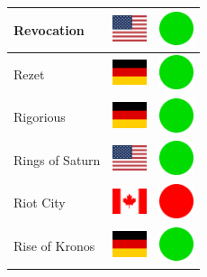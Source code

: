 \documentclass[12pt, a4paper, twoside]{report}
\begin{document}
\begin{center}
\begin{longtable}{|p{5cm}|p{2cm}|p{2cm}|}
 Revocation                                                 & \includegraphics[width=1cm]{../img/flags/us} &   \includegraphics[width=1cm]{../likes/y} \\ \hline
 Rezet                                                      & \includegraphics[width=1cm]{../img/flags/de} &   \includegraphics[width=1cm]{../likes/y} \\ \hline
 Rigorious                                                  & \includegraphics[width=1cm]{../img/flags/de} &   \includegraphics[width=1cm]{../likes/y} \\ \hline
 Rings of Saturn                                            & \includegraphics[width=1cm]{../img/flags/us} &   \includegraphics[width=1cm]{../likes/y} \\ \hline
 Riot City                                                  & \includegraphics[width=1cm]{../img/flags/ca} &   \includegraphics[width=1cm]{../likes/n} \\ \hline
 Rise of Kronos                                             & \includegraphics[width=1cm]{../img/flags/de} &   \includegraphics[width=1cm]{../likes/y} \\ \hline

\end{longtable}
\end{center}
\end{document}
